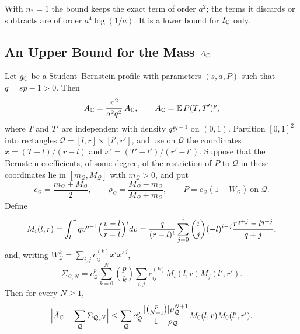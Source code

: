 With $n_*=1$ the bound keeps the exact term of order $a^2$; the terms it
discards or subtracts are of order $a^4\log(1/a)$. It is a lower bound
for $I_\mathbb C$ only.

\subsection{\texorpdfstring{An Upper Bound for the Mass $A_\mathbb C$}{An Upper Bound for the Mass}}

\begin{proposition}\label{pf:mass}
Let $g_\mathbb C$ be a Student--Bernstein profile with parameters $(s,a,P)$
such that $q=sp-1>0$. Then
\begin{equation}\label{pf:polynomial-mass}
 A_\mathbb C=\frac{\pi^2}{a^2q^2}\,\bar A_\mathbb C,\qquad
 \bar A_\mathbb C=\mathbb E\,P(T,T')^p,
\end{equation}
where $T$ and $T'$ are independent with density $qt^{q-1}$ on $(0,1)$.
Partition $[0,1]^2$ into rectangles $\mathcal Q=[l,r]\times[l',r']$, and
use on $\mathcal Q$ the coordinates $x=(T-l)/(r-l)$ and
$x'=(T'-l')/(r'-l')$. Suppose that the Bernstein coefficients, of some
degree, of the restriction of $P$ to $\mathcal Q$ in these coordinates
lie in $[m_{\mathcal Q},M_{\mathcal Q}]$ with $m_{\mathcal Q}>0$, and
put
\[
 c_{\mathcal Q}=\frac{m_{\mathcal Q}+M_{\mathcal Q}}2,\qquad
 \rho_{\mathcal Q}=\frac{M_{\mathcal Q}-m_{\mathcal Q}}
 {M_{\mathcal Q}+m_{\mathcal Q}},\qquad
 P=c_{\mathcal Q}(1+W_{\mathcal Q})\ \text{on }\mathcal Q .
\]
Define
\begin{equation}\label{pf:subrectangle-moments}
 M_i(l,r)=\int_l^rqv^{q-1}\Bigl(\frac{v-l}{r-l}\Bigr)^idv
 =\frac q{(r-l)^i}\sum_{j=0}^i\binom ij(-l)^{i-j}
 \frac{r^{q+j}-l^{q+j}}{q+j},
\end{equation}
and, writing $W_{\mathcal Q}^k=\sum_{i,j}c^{(k)}_{ij}x^ix'^{\,j}$,
\[
 \Sigma_{\mathcal Q,N}=c_{\mathcal Q}^p\sum_{k=0}^N\binom pk
 \sum_{i,j}c^{(k)}_{ij}M_i(l,r)M_j(l',r').
\]
Then for every $N\ge1$,
\begin{equation}\label{pf:subrectangle-mass}
 \Bigl|\bar A_\mathbb C-\sum_{\mathcal Q}\Sigma_{\mathcal Q,N}\Bigr|
 \le\sum_{\mathcal Q}c_{\mathcal Q}^p
 \frac{|\binom p{N+1}|\rho_{\mathcal Q}^{N+1}}{1-\rho_{\mathcal Q}}
 M_0(l,r)M_0(l',r').
\end{equation}
\end{proposition}

